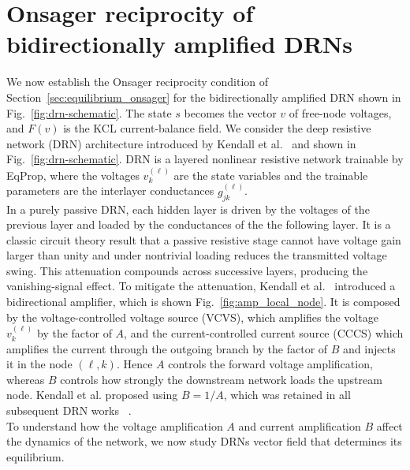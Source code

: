 \documentclass{article}
\begin{document}
\section{Onsager reciprocity of bidirectionally amplified DRNs}
\label{sec:amplified_drn_weighted_symmetry}

We now establish the Onsager reciprocity condition of
Section~\ref{sec:equilibrium_onsager} for the bidirectionally amplified DRN
shown in Fig.~\ref{fig:drn-schematic}. The state $s$ becomes the vector $v$ of
free-node voltages, and $F(v)$ is the KCL current-balance field.
We consider the deep resistive network (DRN) architecture introduced by
Kendall et al.~\cite{Kendall2020} and shown in
Fig.~\ref{fig:drn-schematic}. DRN is a layered nonlinear resistive network
trainable by EqProp, where the voltages \(v_k^{(\ell)}\) are the state variables and the trainable parameters are the interlayer conductances
$g_{jk}^{(\ell)}$.
\\
In a purely passive DRN, each hidden layer is driven by the voltages of the previous layer and loaded by the conductances of the the following layer. It is a classic circuit theory result that a passive resistive stage cannot have voltage gain larger than unity and under nontrivial loading reduces the transmitted voltage swing. This attenuation compounds across successive
layers, producing the vanishing-signal effect. To mitigate the attenuation, Kendall et al.~\cite{Kendall2020} introduced a bidirectional amplifier, which is shown
Fig.~\ref{fig:amp_local_node}. It is composed by the voltage-controlled voltage source (VCVS), which amplifies the voltage $v_k^{(\ell)}$ by the factor of $A$, and the
current-controlled current source (CCCS) which amplifies the current through the outgoing branch by the factor of $B$ and injects it in the node $(\ell,k)$. Hence $A$ controls the forward voltage amplification, whereas $B$ controls how strongly the downstream network loads the upstream node. Kendall et al. proposed using $B=1/A$, which was retained in all subsequent DRN works ~\cite{watfa2023energy}.
\\
To understand how the voltage amplification $A$ and current amplification $B$ affect the dynamics of the network, we now study DRNs vector field that determines its equilibrium.

\end{document}
